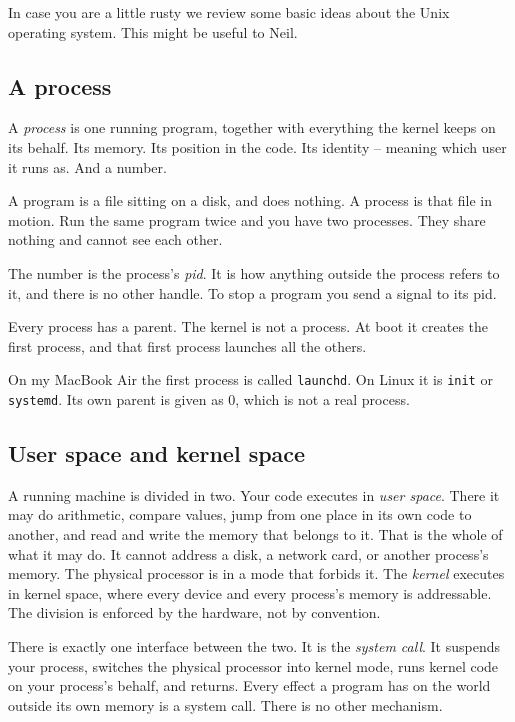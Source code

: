 \documentclass[11pt,a4paper]{article}
\begin{document}
In case you are a little rusty we review some basic ideas about the Unix operating system. This
might be useful to Neil.

\subsection{A process}

A \emph{process} is one running program, together with everything the kernel keeps on its
behalf. Its memory. Its position in the code. Its identity -- meaning which user it runs as. And a
number.

A program is a file sitting on a disk, and does nothing. A process is that file in motion. Run the
same program twice and you have two processes. They share nothing and cannot see each other.

The number is the process's \emph{pid}. It is how anything outside the process refers to it, and
there is no other handle. To stop a program you send a signal to its pid.

Every process has a parent. The kernel is not a process. At boot it creates the first process, and
that first process launches all the others.

On my MacBook Air the first process is called \texttt{launchd}. On Linux it is \texttt{init} or
\texttt{systemd}. Its own parent is given as 0, which is not a real process.

\subsection{User space and kernel space}

A running machine is divided in two. Your code executes in \emph{user space}. There it may do
arithmetic, compare values, jump from one place in its own code to another, and read and write the
memory that belongs to it. That is the whole of what it may do. It cannot address a disk, a network
card, or another process's memory. The physical processor is in a mode that forbids it. The \emph{kernel} executes
in kernel space, where every device and every process's memory is addressable. The division is
enforced by the hardware, not by convention.

There is exactly one interface between the two. It is the \emph{system call}. It suspends your
process, switches the physical processor into kernel mode, runs kernel code on your process's behalf, and
returns. Every effect a program has on the world outside its own memory is a system call. There is
no other mechanism.
\end{document}
